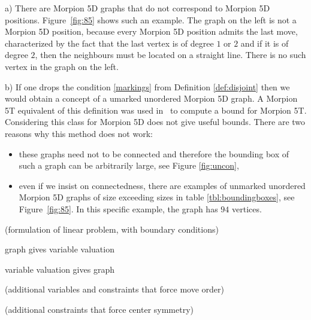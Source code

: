 \begin{remark}
a) There are Morpion 5D graphs that do not correspond to Morpion 5D positions. %
Figure~\ref{fig:85} shows such an example. The graph on the left is not a Morpion 5D position, 
because every Morpion 5D position admits the last move, characterized by the fact that the last vertex is of degree $1$ or $2$ and if it is
of degree $2$, then the neighbours must be located on a straight line. There is no such vertex in the graph on the left.
%

\noindent
b) If one drops the condition \ref{markings} from Definition \ref{def:disjoint} then we would obtain a concept of a umarked unordered Morpion 5D graph. A Morpion 5T equivalent
of this definition was used in~\cite{ijcai} to compute a bound for Morpion 5T.
Considering this class for Morpion 5D  does not give useful bounds. There are two reasons why this method does not work:
\begin{itemize}
\item these graphs need not to be connected and therefore the bounding box of such a graph
  can be arbitrarily large, see Figure \ref{fig:uncon}, 
\item even if we insist on connectedness, there are examples of unmarked unordered Morpion 5D graphs of size exceeding sizes in 
table \ref{tbl:boundingboxes}, see Figure~\ref{fig:85}. In this specific example, the graph has $94$ vertices.
\end{itemize}
\end{remark}

(formulation of linear problem, with boundary conditions)

\begin{lemma}
  graph gives variable valuation
\end{lemma}

\begin{lemma}
  variable valuation gives graph
\end{lemma}

(additional variables and constraints that force move order)

(additional constraints that force center symmetry)
